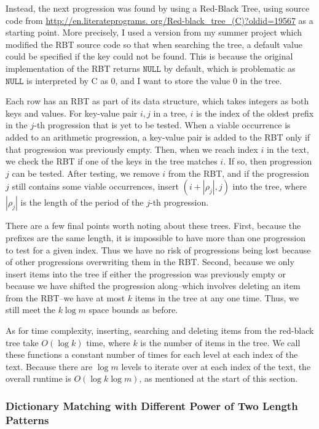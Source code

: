 \documentclass[ %
                    author={Dominic Joseph Moylett},
                    degree={MEng},
                     title={Dictionary Matching with Fingerprints},
                  subtitle={An Empirical Analysis},
                      type={Research},
                      year={2014} ]{dissertation}
\begin{document}
Instead, the next progression was found by using a Red-Black Tree, using source code from \url{http://en.literateprograms.
org/Red-black_tree_(C)?oldid=19567} as a starting point. More precisely, I used a version from my summer project which modified the RBT source code so that when searching the tree, a default value could be specified if the key could not be found. This is because the original implementation of the RBT returns $\texttt{NULL}$ by default, which is problematic as $\texttt{NULL}$ is interpreted by C as 0, and I want to store the value 0 in the tree.

Each row has an RBT as part of its data structure, which takes integers as both keys and values. For key-value pair $i, j$ in a tree, $i$ is the index of the oldest prefix in the $j$-th progression that is yet to be tested. When a viable occurrence is added to an arithmetic progression, a key-value pair is added to the RBT only if that progression was previously empty. Then, when we reach index $i$ in the text, we check the RBT if one of the keys in the tree matches $i$. If so, then progression $j$ can be tested. After testing, we remove $i$ from the RBT, and if the progression $j$ still contains some viable occurrences, insert $(i + |\rho_j|, j)$ into the tree, where $|\rho_j|$ is the length of the period of the $j$-th progression.

There are a few final points worth noting about these trees. First, because the prefixes are the same length, it is impossible to have more than one progression to test for a given index. Thus we have no risk of progressions being lost because of other progressions overwriting them in the RBT. Second, because we only insert items into the tree if either the progression was previously empty or because we have shifted the progression along--which involves deleting an item from the RBT--we have at most $k$ items in the tree at any one time. Thus, we still meet the $k\log m$ space bounds as before.

As for time complexity, inserting, searching and deleting items from the red-black tree take $O(\log k)$ time, where $k$ is the number of items in the tree. We call these functions a constant number of times for each level at each index of the text. Because there are $\log m$ levels to iterate over at each index of the text, the overall runtime is $O(\log k\log m)$, as mentioned at the start of this section.

\subsubsection{Dictionary Matching with Different Power of Two Length Patterns}
\end{document}
